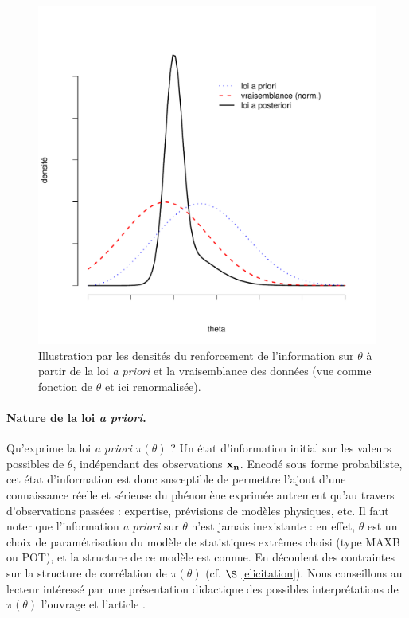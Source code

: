 \begin{figure}[h!]
\centering
\vspace{2cm}
\includegraphics[scale=0.56,natwidth=380,natheight=380]{figures/ex-bayes-1.pdf}
\caption{Illustration par les densit\'es du renforcement de l'information sur $\theta$ \`a partir de la loi {\it a priori} et la vraisemblance des donn\'ees (vue comme fonction de $\theta$ et ici renormalis\'ee). }
\label{illust-bayes}
\end{figure} 




\paragraph*{\bf Nature de la loi {\it a priori}.}
 Qu'exprime la loi {\it a priori} $\pi(\theta)$ ? Un \'etat d'information initial sur les valeurs possibles de $\theta$, ind\'ependant des observations ${\bf x_n}$. Encod\'e sous forme probabiliste, cet \'etat d'information est donc susceptible de permettre l'ajout d'une connaissance r\'eelle et s\'erieuse du ph\'enom\`ene exprim\'ee autrement  qu'au travers d'observations pass\'ees : expertise, pr\'evisions de mod\`eles physiques, etc. Il faut noter que l'information {\it a priori} sur $\theta$ n'est jamais inexistante : en effet, $\theta$ est un choix de param\'etrisation du mod\`ele de statistiques extr\^emes choisi (type MAXB ou POT), et la structure de ce mod\`ele est connue. En d\'ecoulent des contraintes sur la structure de corr\'elation de $\pi(\theta)$ (cf. $\S$ \ref{elicitation}). Nous conseillons au lecteur int\'eress\'e par une pr\'esentation didactique des possibles interpr\'etations de $\pi(\theta)$ l'ouvrage \cite{Parent2007} et l'article \cite{Pasanisi2012}. 



